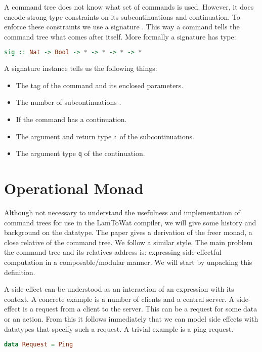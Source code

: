 A command tree does not know what set of commands is used. However, it does encode strong type constraints on its subcontinuations and continuation. To enforce these constraints we use a signature . This way a command tells the command tree what comes after itself. More formally a signature has type:

\begin{lstlisting}[language=Haskell]
sig :: Nat -> Bool -> * -> * -> * -> *
\end{lstlisting}

A signature instance  tells us the following things:

\begin{itemize}
\item The tag of the command and its enclosed parameters.
\item The number of subcontinuations .
\item If the command has a continuation.
\item The argument  and return type \lstinline{r} of the subcontinuations.
\item The argument type \lstinline{q} of the continuation.
\end{itemize}

\section{\label{opmonad}Operational Monad}
Although not necessary to understand the usefulness and implementation of command trees for use in the LamToWat compiler, we will give some history and background on the datatype. The paper  gives a derivation of the freer monad, a close relative of the command tree. We follow a similar style. The main problem the command tree and its relatives address is: expressing side-effectful computation in a composable/modular manner. We will start by unpacking this definition.

A side-effect can be understood as an interaction of an expression with its context\autocite{DBLP:conf/tacs/CartwrightF94}. A concrete example is a number of clients and a central server. A side-effect is a request from a client to the server. This can be a request for some data or an action. From this it follows immediately that we can model side effects with datatypes that specify such a request. A trivial example is a ping request.

\begin{lstlisting}[language=Haskell]
data Request = Ping
\end{lstlisting}

